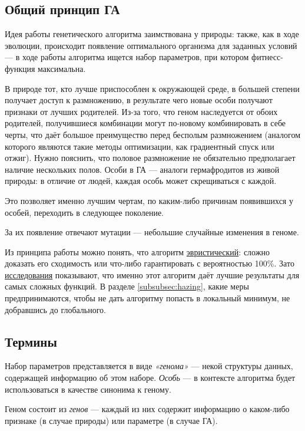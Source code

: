 \subsection{Общий принцип ГА}\label{subsec:ga_general_principles}
Идея работы генетического алгоритма заимствована у природы: также, как в ходе эволюции, происходит появление оптимального организма для заданных условий — в ходе работы алгоритма ищется набор параметров, при котором фитнесс-функция максимальна.

В природе тот, кто лучше приспособлен к окружающей среде, в большей степени получает доступ к размножению,
в результате чего новые особи получают признаки от лучших родителей.
Из-за того, что геном наследуется от обоих родителей, получившиеся комбинации могут по-новому комбинировать в себе черты,
что даёт большое преимущество перед бесполым размножением (аналогом которого являются такие методы оптимизации, как градиентный спуск или отжиг).
Нужно пояснить, что половое размножение не обязательно предполагает наличие нескольких полов.
Особи в ГА — аналоги гермафродитов из живой природы: в отличие от людей, каждая особь может скрещиваться с каждой.

Это позволяет именно лучшим чертам, по каким-либо причинам появившихся у особей, переходить в следующее поколение.

За их появление отвечают мутации — небольшие случайные изменения в геноме.

Из принципа работы можно понять, что алгоритм \href{https://en.wikipedia.org/wiki/Heuristic_(computer_science)}{эвристический}: сложно доказать его сходимость или что-либо гарантировать с вероятностью 100\%.
Зато \href{talgat.org/news/wp-content/uploads/2018/08/112.pdf}{исследования} показывают, что именно этот алгоритм даёт лучшие результаты для самых сложных функций.
В разделе \ref{subsubsec:hazing}, какие меры предпринимаются, чтобы не дать алгоритму попасть в локальный минимум, не добравшись до глобального.

\subsection{Термины}\label{subsec:ga_principles}
Набор параметров представляется в виде \textit{«генома»} — некой структуры данных, содержащей информацию об этом наборе.
\textit{Особь} — в контексте алгоритма будет использоваться в качестве синонима к геному.

Геном состоит из \textit{генов} — каждый из них содержит информацию о каком-либо признаке (в случае природы) или параметре (в случае ГА).

